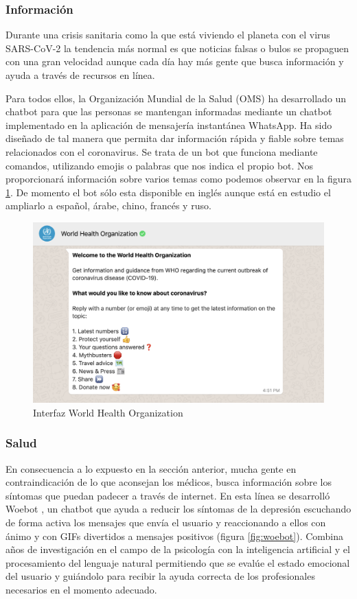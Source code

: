 \subsubsection{Información}
Durante una crisis sanitaria como la que está viviendo el planeta con el virus SARS-CoV-2 la tendencia más normal es que noticias falsas o bulos se propaguen con una gran velocidad aunque cada día hay más gente que busca información y ayuda a través de recursos en línea. 

Para todos ellos, la Organización Mundial de la Salud (OMS) \cite{oms} ha desarrollado un chatbot para que las personas se mantengan informadas mediante un chatbot implementado en la aplicación de mensajería instantánea WhatsApp. Ha sido diseñado de tal manera que permita dar información rápida y fiable sobre temas relacionados con el coronavirus. Se trata de un bot que funciona mediante comandos, utilizando emojis o palabras que nos indica el propio bot. Nos proporcionará información sobre varios temas como podemos observar en la figura \ref{fig:oms}. De momento el bot sólo esta disponible en inglés aunque está en estudio el ampliarlo a español, árabe, chino, francés y ruso.

\begin{figure}[H]
    \centering
    \includegraphics[scale=0.8]{include/figuras/oms.png}
    \caption{Interfaz World Health Organization}
    \label{fig:oms}
\end{figure}
\newpage
\subsubsection{Salud}
En consecuencia a lo expuesto en la sección anterior, mucha gente en contraindicación de lo que aconsejan los médicos, busca información sobre los síntomas que puedan padecer a través de internet. En esta línea se desarrolló Woebot \cite{woebot}, un chatbot que ayuda a reducir los síntomas de la depresión escuchando de forma activa los mensajes que envía el usuario y reaccionando a ellos con ánimo y con GIFs divertidos a mensajes positivos (figura \ref{fig:woebot}). Combina años de investigación en el campo de la psicología con la inteligencia artificial y el procesamiento del lenguaje natural permitiendo que se evalúe el estado emocional del usuario y guiándolo para recibir la ayuda correcta de los profesionales necesarios en el momento adecuado.


